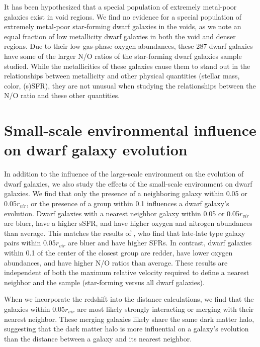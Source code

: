 It has been hypothesized that a special population of extremely metal-poor 
galaxies exist in void regions.  We find no evidence for a special population of 
extremely metal-poor star-forming dwarf galaxies in the voids, as we note an 
equal fraction of low metallicity dwarf galaxies in both the void and denser 
regions.  Due to their low gas-phase oxygen abundances, these 287 dwarf galaxies 
have some of the larger N/O ratios of the star-forming dwarf galaxies sample 
studied.  While the metallicities of these galaxies cause them to stand out in 
the relationships between metallicity and other physical quantities (stellar 
mass, color, (s)SFR), they are not unusual when studying the relationships 
between the N/O ratio and these other quantities.

\section[Small-scale environment]{Small-scale environmental influence on dwarf galaxy evolution}
In addition to the influence of the large-scale environment on the evolution of 
dwarf galaxies, we also study the effects of the small-scale environment on dwarf 
galaxies.  We find that only the presence of a neighboring galaxy within 0.05 
\hMpc or 0.05$r_{vir}$, or the presence of a group within 0.1 \hMpc influences a 
dwarf galaxy's evolution.  Dwarf galaxies with a nearest neighbor galaxy within 
0.05 \hMpc or 0.05$r_{vir}$ are bluer, have a higher sSFR, and have higher 
oxygen and nitrogen abundances than average.  This matches the results of 
\cite{Park09}, who find that late-late type galaxy pairs within 0.05$r_{vir}$ 
are bluer and have higher SFRs.  In contrast, dwarf galaxies within 0.1 \hMpc of 
the center of the closest group are redder, have lower oxygen abundances, and 
have higher N/O ratios than average.  These results are independent of both the 
maximum relative velocity required to define a nearest neighbor and the sample 
(star-forming versus all dwarf galaxies).

When we incorporate the redshift into the distance calculations, we find that 
the galaxies within 0.05$r_{vir}$ are most likely strongly interacting or 
merging with their nearest neighbor.  These merging galaxies likely share the 
same dark matter halo, suggesting that the dark matter halo is more influential 
on a galaxy's evolution than the distance between a galaxy and its nearest 
neighbor.

